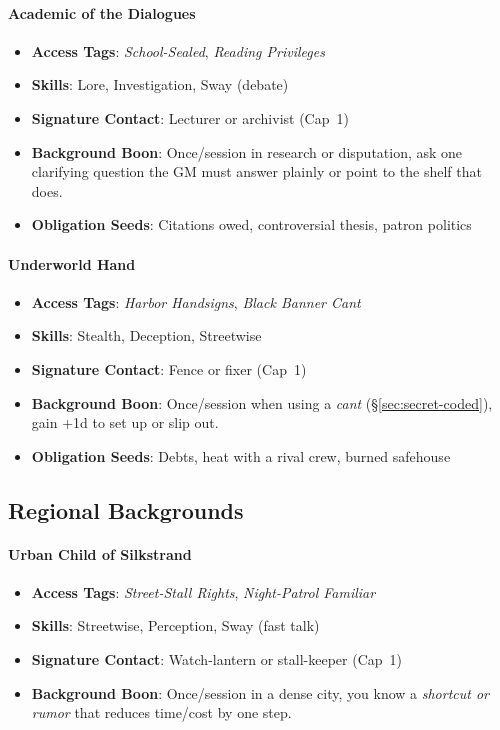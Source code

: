\begin{multicols}{2}
\paragraph{Academic of the Dialogues}
\begin{itemize}
\item \textbf{Access Tags}: \textit{School-Sealed}, \textit{Reading Privileges}
\item \textbf{Skills}: Lore, Investigation, Sway (debate)
\item \textbf{Signature Contact}: Lecturer or archivist (Cap~1)
\item \textbf{Background Boon}: Once/session in research or disputation, ask one clarifying question the GM must answer plainly or point to the shelf that does.
\item \textbf{Obligation Seeds}: Citations owed, controversial thesis, patron politics
\end{itemize}

\paragraph{Underworld Hand}
\begin{itemize}
\item \textbf{Access Tags}: \textit{Harbor Handsigns}, \textit{Black Banner Cant}
\item \textbf{Skills}: Stealth, Deception, Streetwise
\item \textbf{Signature Contact}: Fence or fixer (Cap~1)
\item \textbf{Background Boon}: Once/session when using a \emph{cant} (\S\ref{sec:secret-coded}), gain +1d to set up or slip out.
\item \textbf{Obligation Seeds}: Debts, heat with a rival crew, burned safehouse
\end{itemize}

\subsection*{Regional Backgrounds}

\paragraph{Urban Child of Silkstrand}
\begin{itemize}
\item \textbf{Access Tags}: \textit{Street-Stall Rights}, \textit{Night-Patrol Familiar}
\item \textbf{Skills}: Streetwise, Perception, Sway (fast talk)
\item \textbf{Signature Contact}: Watch-lantern or stall-keeper (Cap~1)
\item \textbf{Background Boon}: Once/session in a dense city, you know a \emph{shortcut or rumor} that reduces time/cost by one step.
\end{itemize}


\end{multicols}
